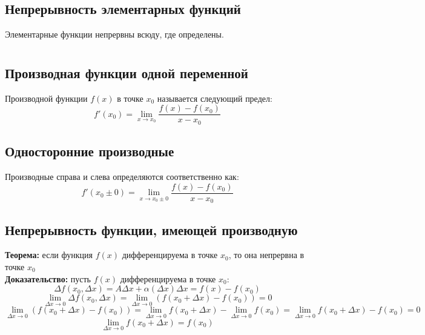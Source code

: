 \documentclass{article}
\newcommand{\theorem}{\textbf{Теорема:} }
\newcommand{\proof}{\textbf{Доказательство:} }
\begin{document}
    \subsection*{Непрерывность элементарных функций}
        Элементарные функции непрервны всюду, где определены.
        

    \newpage
    
    \section{}
    \subsection*{Производная функции одной переменной}
        Производной функции $f(x)$ в точке $x_0$ называется следующий предел:
        \[ f'(x_0) = \lim_{x \to x_0} \frac{f(x) - f(x_0)}{x - x_0} \]
        
        
    \subsection*{Односторонние производные}
        Производные справа и слева определяются соответственно как:
        \[ f'(x_0 \pm 0) = \lim_{x \to x_0 \pm 0} \frac{f(x) - f(x_0)}{x - x_0} \]
        
        
    \subsection*{Непрерывность функции, имеющей производную}
        \theorem если функция $f(x)$ дифференцируема в точке $x_0$, то она непрервна в точке $x_0$
        \\
        \proof пусть $f(x)$ дифференцируема в точке $x_0$:
        \[ \Delta f(x_0, \Delta x) = A \Delta x + \alpha(\Delta x) \Delta x = f(x) - f(x_0) \]
        \[ \lim_{\Delta x \to 0} \Delta f(x_0, \Delta x) = \lim_{\Delta x \to 0} \left( f(x_0 + \Delta x) - f(x_0) \right) = 0 \]
        \[ \lim_{\Delta x \to 0} \left( f(x_0 + \Delta x) - f(x_0) \right) = \lim_{\Delta x \to 0} f(x_0 + \Delta x) - \lim_{\Delta x \to 0} f(x_0) =
           \lim_{\Delta x \to 0} f(x_0 + \Delta x) - f(x_0) = 0 \]
        \[ \lim_{\Delta x \to 0} f(x_0 + \Delta x) = f(x_0) \]
\end{document}
